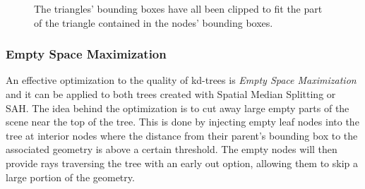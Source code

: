 \begin{figure}
  \centering

  \hspace{5mm}
  \hspace{5mm}

  \vspace{3mm}
  \parbox{10cm}{ \caption[Triangle clipping.]{The triangles' bounding boxes have
      all been clipped to fit the part of the triangle contained in the nodes'
      bounding boxes.}\label{fig:aabbClipped}}
\end{figure}


\subsubsection{Empty Space Maximization}\label{sec:emptySpace}

An effective optimization to the quality of kd-trees is \textit{Empty Space
  Maximization} and it can be applied to both trees created with Spatial Median
Splitting or SAH. The idea behind the optimization is to cut away large empty
parts of the scene near the top of the tree. This is done by injecting empty
leaf nodes into the tree at interior nodes where the distance from their
parent's bounding box to the associated geometry is above a certain
threshold. The empty nodes will then provide rays traversing the tree with an
early out option, allowing them to skip a large portion of the geometry.

